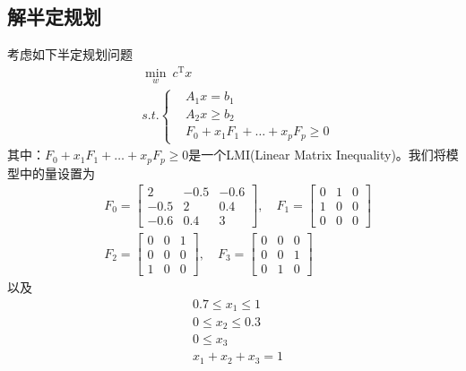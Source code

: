     \subsection{解半定规划}
        \par
        考虑如下半定规划问题
        \begin{align*}
        &\min_w \ c^\mathrm{T}x\\
        &s.t.\left\{
        \begin{aligned}
        &A_1x = b_1\\
        &A_2x \geqslant b_2\\
        &F_0 + x_1F_1+\dots+x_pF_p \geqslant 0
        \end{aligned}
        \right.
        \end{align*}
        其中：$F_0+x_1F_1 + \dots+x_pF_p\geqslant 0$是一个LMI(Linear Matrix Inequality)。我们将模型中的量设置为
        \begin{align*}
        &F_0 =
        \begin{bmatrix}
        2& -0.5 & -0.6\\
        -0.5& 2 & 0.4 \\
        -0.6 & 0.4 & 3
        \end{bmatrix}
        ,\quad
        F_1 =
        \begin{bmatrix}
        0 & 1 & 0\\
        1 & 0 & 0\\
        0 & 0 & 0
        \end{bmatrix}
        \\
        &F_2 =
        \begin{bmatrix}
        0 & 0 & 1\\
        0 & 0 & 0\\
        1 & 0 & 0
        \end{bmatrix}
        ,\quad
        F_3 =
        \begin{bmatrix}
        0 & 0 & 0\\
        0 & 0 & 1\\
        0 & 1 & 0
        \end{bmatrix}
        \end{align*}
        以及
        \begin{align*}
        & 0.7 \leqslant x_1 \leqslant 1\\
        & 0 \leqslant x_2 \leqslant 0.3\\
        & 0 \leqslant x_3\\
        & x_1+x_2+x_3 = 1
        \end{align*}
